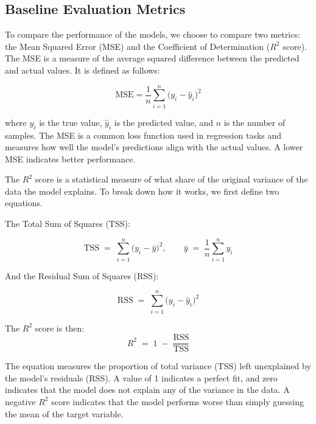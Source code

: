 \documentclass[twoside]{ctuthesis}
\theoremstyle{plain}
\theoremstyle{definition}
\theoremstyle{note}
\begin{document}
\subsection{Baseline Evaluation Metrics}

To compare the performance of the models, we choose to compare two metrics: the Mean Squared Error (MSE) and the Coefficient of Determination ($R^2$ score). The MSE is a measure of the average squared difference between the predicted and actual values. It is defined as follows:\par

\begin{equation}
 \mathrm{MSE} = \frac{1}{n}\sum_{i=1}^{n}\bigl(y_i - \hat{y}_i\bigr)^2
\end{equation}

where $y_i$ is the true value, $\hat{y}_i$ is the predicted value, and $n$ is the number of samples. The MSE is a common loss function used in regression tasks and measures how well the model's predictions align with the actual values. A lower MSE indicates better performance.\par

The $R^2$ score is a statistical measure of what share of the original variance of the data the model explains. To break down how it works, we first define two equations.\par
The Total Sum of Squares (TSS):\par
\begin{equation}
 \mathrm{TSS} \;=\; \sum_{i=1}^{n} \bigl(y_i - \bar{y}\bigr)^2,
 \qquad
 \bar{y} \;=\; \frac{1}{n}\sum_{i=1}^{n} y_i
\end{equation}


And the Residual Sum of Squares (RSS):\par
\begin{equation}
 \mathrm{RSS} \;=\; \sum_{i=1}^{n} \bigl(y_i - \hat{y}_i\bigr)^2
\end{equation}

The $R^2$ score is then:
\begin{equation}
 R^{2} \;=\; 1 \;-\; \frac{\mathrm{RSS}}{\mathrm{TSS}}
\end{equation}

The equation measures the proportion of total variance (TSS) left unexplained by the model's residuals (RSS). A value of 1 indicates a perfect fit, and zero indicates that the model does not explain any of the variance in the data. A negative $R^2$ score indicates that the model performs worse than simply guessing the mean of the target variable.\par
\end{document}
